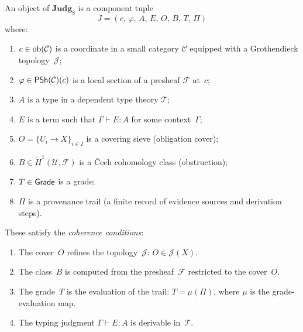 \begin{definition}
\label{def:judg8-obj}
An object of $\mathbf{Judg}_8$ is a component tuple
\[
  J = (c,\,\varphi,\,A,\,E,\,O,\,B,\,T,\,\Pi)
\]
where:
\begin{enumerate}[label=(\roman*),nosep]
\item $c \in \mathrm{ob}(\mathcal{C})$ is a coordinate in a small category $\mathcal{C}$
  equipped with a Grothendieck topology~$\mathcal{J}$;
\item $\varphi \in \mathsf{PSh}(\mathcal{C})(c)$ is a local section of a
  presheaf $\mathcal{F}$ at~$c$;
\item $A$ is a type in a dependent type theory $\mathcal{T}$;
\item $E$ is a term such that $\Gamma \vdash E : A$ for some context~$\Gamma$;
\item $O = \{U_i \to X\}_{i \in I}$ is a covering sieve (obligation cover);
\item $B \in \check{H}^1(\mathcal{U}, \mathcal{F})$ is a \v{C}ech
  cohomology class (obstruction);
\item $T \in \mathsf{Grade}$ is a grade;
\item $\Pi$ is a provenance trail (a finite record of evidence sources
  and derivation steps).
\end{enumerate}
These satisfy the \emph{coherence conditions}:
\begin{enumerate}[label=(C\arabic*),nosep]
\item The cover~$O$ refines the topology~$\mathcal{J}$:
  $O \in \mathcal{J}(X)$.
\item The class~$B$ is computed from the presheaf~$\mathcal{F}$
  restricted to the cover~$O$.
\item The grade~$T$ is the evaluation of the trail:
  $T = \mu(\Pi)$, where $\mu$ is the grade-evaluation map.
\item The typing judgment $\Gamma \vdash E : A$ is derivable in~$\mathcal{T}$.
\end{enumerate}
\end{definition}

